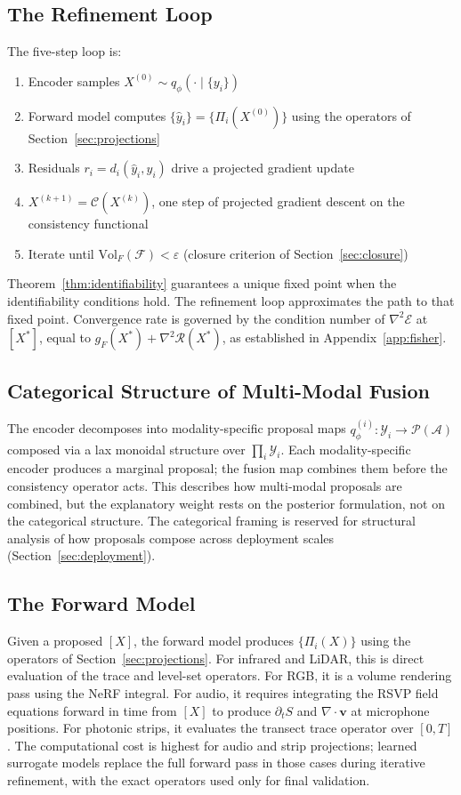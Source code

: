 \documentclass[11pt, oneside]{article}
\begin{document}
\subsection{The Refinement Loop}

The five-step loop is:
\begin{enumerate}
\item Encoder samples $X^{(0)} \sim q_\phi(\cdot \mid \{y_i\})$
\item Forward model computes $\{\hat{y}_i\} = \{\Pi_i(X^{(0)})\}$ using the operators
  of Section~\ref{sec:projections}
\item Residuals $r_i = d_i(\hat{y}_i, y_i)$ drive a projected gradient update
\item $X^{(k+1)} = \mathcal{C}(X^{(k)})$, one step of projected gradient descent on
  the consistency functional
\item Iterate until $\mathrm{Vol}_F(\mathcal{F}) < \varepsilon$ (closure criterion of
  Section~\ref{sec:closure})
\end{enumerate}
Theorem~\ref{thm:identifiability} guarantees a unique fixed point when the identifiability
conditions hold. The refinement loop approximates the path to that fixed point. Convergence
rate is governed by the condition number of $\nabla^2\mathcal{E}$ at $[X^*]$, equal to
$g_F(X^*) + \nabla^2\mathcal{R}(X^*)$, as established in Appendix~\ref{app:fisher}.

\subsection{Categorical Structure of Multi-Modal Fusion}

The encoder decomposes into modality-specific proposal maps
$q_\phi^{(i)} : \mathcal{Y}_i \to \mathcal{P}(\mathcal{A})$ composed via a lax monoidal
structure over $\prod_i \mathcal{Y}_i$. Each modality-specific encoder produces a marginal
proposal; the fusion map combines them before the consistency operator acts. This describes
how multi-modal proposals are combined, but the explanatory weight rests on the posterior
formulation, not on the categorical structure. The categorical framing is reserved for
structural analysis of how proposals compose across deployment scales
(Section~\ref{sec:deployment}).

\subsection{The Forward Model}

Given a proposed $[X]$, the forward model produces $\{\Pi_i(X)\}$ using the operators of
Section~\ref{sec:projections}. For infrared and LiDAR, this is direct evaluation of the
trace and level-set operators. For RGB, it is a volume rendering pass using the NeRF
integral. For audio, it requires integrating the RSVP field equations forward in time from
$[X]$ to produce $\partial_t S$ and $\nabla\cdot\mathbf{v}$ at microphone positions. For
photonic strips, it evaluates the transect trace operator over $[0,T]$. The computational
cost is highest for audio and strip projections; learned surrogate models replace the full
forward pass in those cases during iterative refinement, with the exact operators used only
for final validation.
\end{document}
